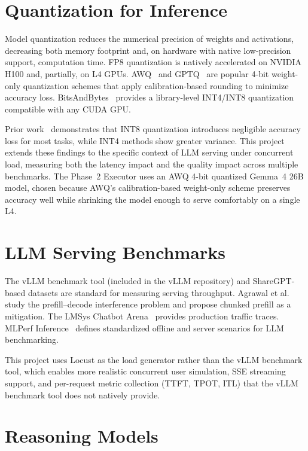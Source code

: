 \documentclass[a4paper,12pt]{report}
\begin{document}
\section{Quantization for Inference}

Model quantization reduces the numerical precision of weights and activations, decreasing both memory footprint and, on hardware with native low-precision support, computation time. FP8 quantization is natively accelerated on NVIDIA H100 and, partially, on L4 GPUs. AWQ~\cite{awq} and GPTQ~\cite{gptq} are popular 4-bit weight-only quantization schemes that apply calibration-based rounding to minimize accuracy loss. BitsAndBytes~\cite{bnb} provides a library-level INT4/INT8 quantization compatible with any CUDA GPU.

Prior work~\cite{dettmers2022llmint8} demonstrates that INT8 quantization introduces negligible accuracy loss for most tasks, while INT4 methods show greater variance. This project extends these findings to the specific context of LLM serving under concurrent load, measuring both the latency impact and the quality impact across multiple benchmarks. The Phase~2 Executor uses an AWQ 4-bit quantized Gemma~4 26B model, chosen because AWQ's calibration-based weight-only scheme preserves accuracy well while shrinking the model enough to serve comfortably on a single L4.

\section{LLM Serving Benchmarks}

The vLLM benchmark tool (included in the vLLM repository) and ShareGPT-based datasets are standard for measuring serving throughput. Agrawal et al.~\cite{agrawal2024sarathi} study the prefill--decode interference problem and propose chunked prefill as a mitigation. The LMSys Chatbot Arena~\cite{lmsys} provides production traffic traces. MLPerf Inference~\cite{mlperf} defines standardized offline and server scenarios for LLM benchmarking.

This project uses Locust as the load generator rather than the vLLM benchmark tool, which enables more realistic concurrent user simulation, SSE streaming support, and per-request metric collection (TTFT, TPOT, ITL) that the vLLM benchmark tool does not natively provide.

\section{Reasoning Models}
\end{document}
